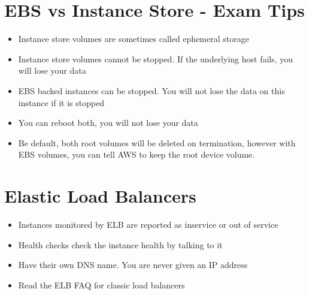 \documentclass{article}
\begin{document}
\section{EBS vs Instance Store - Exam Tips}
\begin{itemize}
\item
Instance store volumes are sometimes called ephemeral storage

\item
Instance store volumes cannot be stopped. If the underlying host fails, you will lose your data

\item
EBS backed instances can be stopped. You will not lose the data on this instance if it is stopped

\item
You can reboot both, you will not lose your data

\item
Be default, both root volumes will be deleted on termination, however with EBS volumes, you can tell AWS to keep the root device volume.
\end{itemize}

\section{Elastic Load Balancers}
\begin{itemize}
\item
Instances monitored by ELB are reported as inservice or out of service

\item
Health checks check the instance health by talking to it

\item
Have their own DNS name. You are never given an IP address

\item
Read the ELB FAQ for classic load balancers



\end{itemize}
\end{document}

